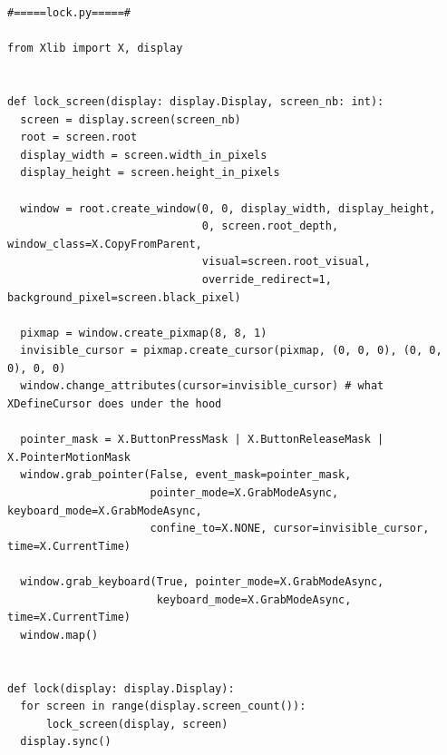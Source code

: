 \documentclass[french]{report}
\begin{document}
\newpage

\begin{verbatim}
#=====lock.py=====#

from Xlib import X, display


def lock_screen(display: display.Display, screen_nb: int):
  screen = display.screen(screen_nb)
  root = screen.root
  display_width = screen.width_in_pixels
  display_height = screen.height_in_pixels

  window = root.create_window(0, 0, display_width, display_height,
                              0, screen.root_depth, window_class=X.CopyFromParent,
                              visual=screen.root_visual,
                              override_redirect=1, background_pixel=screen.black_pixel)

  pixmap = window.create_pixmap(8, 8, 1)
  invisible_cursor = pixmap.create_cursor(pixmap, (0, 0, 0), (0, 0, 0), 0, 0)
  window.change_attributes(cursor=invisible_cursor) # what XDefineCursor does under the hood

  pointer_mask = X.ButtonPressMask | X.ButtonReleaseMask | X.PointerMotionMask
  window.grab_pointer(False, event_mask=pointer_mask,
                      pointer_mode=X.GrabModeAsync, keyboard_mode=X.GrabModeAsync,
                      confine_to=X.NONE, cursor=invisible_cursor, time=X.CurrentTime)

  window.grab_keyboard(True, pointer_mode=X.GrabModeAsync,
                       keyboard_mode=X.GrabModeAsync, time=X.CurrentTime)
  window.map()


def lock(display: display.Display):
  for screen in range(display.screen_count()):
      lock_screen(display, screen)
  display.sync()

\end{verbatim}
\newpage
\end{document}
